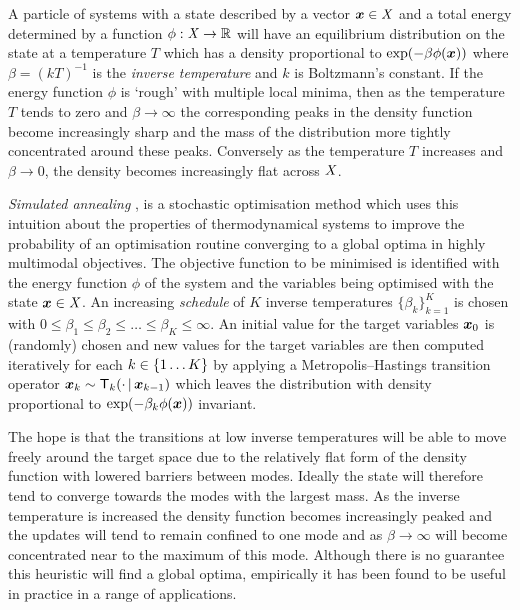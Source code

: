 A particle of systems with a state described by a vector $\boldsymbol{x} \in \mathit{X}$ and a total energy determined by a function $\phi : \mathit{X} \to \mathbb{R}$ will have an equilibrium distribution on the state at a temperature $T$ which has a density proportional to $\exp\lpa -\beta \phi(\vct{x})\rpa$ where $\beta = (kT)^{-1}$ is the \emph{inverse temperature} and $k$ is Boltzmann's constant. If the energy function $\phi$ is `rough' with multiple local minima, then as the temperature $T$ tends to zero and $\beta \to \infty$ the corresponding peaks in the density function become increasingly sharp and the mass of the distribution more tightly concentrated around these peaks. Conversely as the temperature $T$ increases and $\beta \to 0$, the density becomes increasingly flat across $\mathit{X}$.%

\emph{Simulated annealing} \citep{kirkpatrick1983optimization,ackley1985learning}, is a stochastic optimisation method which uses this intuition about the properties of thermodynamical systems to improve the probability of an optimisation routine converging to a global optima in highly multimodal objectives. The objective function  to be minimised is identified with the energy function $\phi$ of the system and the variables being optimised with the state $\boldsymbol{x} \in \mathit{X}$. An increasing \emph{schedule} of $K$ inverse temperatures $\lbrace \beta_k \rbrace_{k=1}^K$ is chosen with $0 \leq \beta_1 \leq \beta_2 \leq \dots \leq \beta_K \leq \infty$. An initial value for the target variables $\boldsymbol{x}_0$ is (randomly) chosen and new values for the target variables are then computed iteratively for each $k \in \fset{1 \dots K}$ by applying a Metropolis--Hastings transition operator $\boldsymbol{x}_k \sim \mathsf{T}_k(\cdot \operatorname{|} \boldsymbol{x}_{k-1})$ which leaves the distribution with density proportional to $\exp\lpa-\beta_k\phi(\vct{x})\rpa$ invariant. 

The hope is that the transitions at low inverse temperatures will be able to move freely around the target space due to the relatively flat form of the density function with lowered barriers between modes. Ideally the state will therefore tend to converge towards the modes with the largest mass. As the inverse temperature is increased the density function becomes increasingly peaked and the updates will tend to remain confined to one mode and as $\beta \to \infty$ will become concentrated near to the maximum of this mode. Although there is no guarantee this heuristic will find a global optima, empirically it has been found to be useful in practice in a range of applications.

